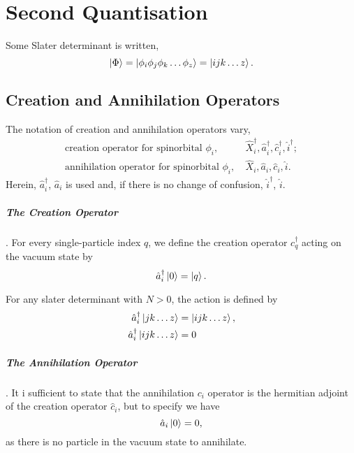 \chapter{Second Quantisation}

Some Slater determinant is written,
\begin{equation}
    \ket{\Phi} = \ket{\phi_i \phi_j \phi_k \dots \phi_z} = \ket{ijk \dots z}.
\end{equation}

\section{Creation and Annihilation Operators}

    The notation of creation and annihilation operators vary,
    \begin{align*}
        \text{creation operator for spinorbital } \phi_i, &\ 
        \hat{X}_i^\dagger, \hat{a}^\dagger_i, \hat{c}_i^\dagger, \hat{i}^\dagger; \\
        \text{annihilation operator for spinorbital } \phi_i, &\ 
        \hat{X}_i, \hat{a}_i, \hat{c}_i, \hat{i}.       
    \end{align*}
    Herein, $\hat{a}_i^\dagger$, $\hat{a}_i$ is used and, if there is no change of 
    confusion, $\hat{i}^\dagger$, $\hat{i}$.

    \paragraph{The Creation Operator}. For every single-particle index $q$,
    we define the creation operator
    $c_q^\dagger$ acting on the vacuum state by
    \begin{equation}
        \hat{a}_i^\dagger \ket{0} = \ket{q}.
    \end{equation}

    For any slater determinant with $N > 0$, the action is defined by
    \begin{align}
        \hat{a}_i^\dagger\ket{jk \dots z} &= \ket{ijk \dots z}, \\
        \hat{a}_i^\dagger\ket{ijk \dots z} &= 0
    \end{align}

    \paragraph{The Annihilation Operator}. It i sufficient to state that the 
    annihilation $c_i$ operator is the hermitian adjoint of the creation operator
    $\hat{c}_i$, but to specify we have
    \begin{equation}
        \hat{a}_i\ket{0} = 0,
    \end{equation}
    as there is no particle in the vacuum state to annihilate. 

